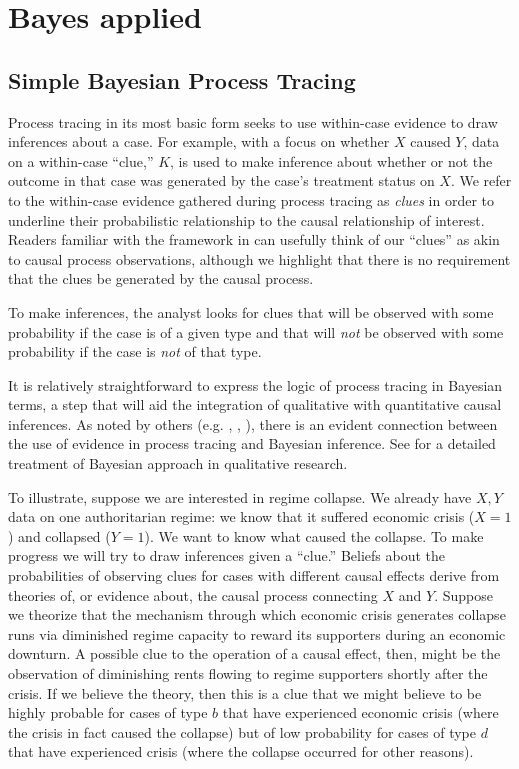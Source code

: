 \documentclass[
  12pt,
]{book}
\begin{document}
\hypertarget{bayes-applied}{%
\section{Bayes applied}\label{bayes-applied}}

\hypertarget{simple-bayesian-process-tracing}{%
\subsection{Simple Bayesian Process Tracing}\label{simple-bayesian-process-tracing}}

Process tracing in its most basic form seeks to use within-case evidence to draw inferences about a case. For example, with a focus on whether \(X\) caused \(Y\), data on a within-case ``clue,'' \(K\), is used to make inference about whether or not the outcome in that case was generated by the case's treatment status on \(X\). We refer to the within-case evidence gathered during process tracing as \emph{clues} in order to underline their probabilistic relationship to the causal relationship of interest. Readers familiar with the framework in \citet{collier2004sources} can usefully think of our ``clues'' as akin to causal process observations, although we highlight that there is no requirement that the clues be generated by the causal process.

To make inferences, the analyst looks for clues that will be observed with some probability if the case is of a given type and that will \emph{not} be observed with some probability if the case is \emph{not} of that type.

It is relatively straightforward to express the logic of process tracing in Bayesian terms, a step that will aid the integration of qualitative with quantitative causal inferences. As noted by others (e.g. \citet{BennettBayes}, \citet{beachpedersen2013process}, \citet{rohlfing2012case}), there is an evident connection between the use of evidence in process tracing and Bayesian inference. See \citet{fairfield2017explicit} for a detailed treatment of Bayesian approach in qualitative research.

To illustrate, suppose we are interested in regime collapse. We already have \(X,Y\) data on one authoritarian regime: we know that it suffered economic crisis (\(X=1\)) and collapsed (\(Y=1\)). We want to know what caused the collapse. To make progress we will try to draw inferences given a ``clue.'' Beliefs about the probabilities of observing clues for cases with different causal effects derive from theories of, or evidence about, the causal process connecting \(X\) and \(Y\). Suppose we theorize that the mechanism through which economic crisis generates collapse runs via diminished regime capacity to reward its supporters during an economic downturn. A possible clue to the operation of a causal effect, then, might be the observation of diminishing rents flowing to regime supporters shortly after the crisis. If we believe the theory, then this is a clue that we might believe to be highly probable for cases of type \(b\) that have experienced economic crisis (where the crisis in fact caused the collapse) but of low probability for cases of type \(d\) that have experienced crisis (where the collapse occurred for other reasons).
\end{document}
